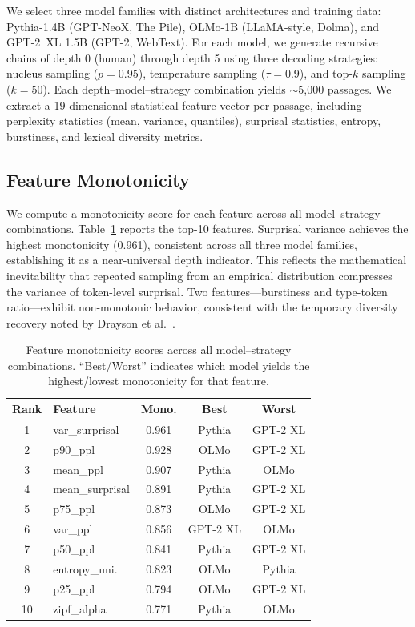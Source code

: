 \documentclass[11pt,a4paper]{article}
\begin{document}
We select three model families with distinct architectures and training data: Pythia-1.4B (GPT-NeoX, The Pile), OLMo-1B (LLaMA-style, Dolma), and GPT-2~XL 1.5B (GPT-2, WebText).
For each model, we generate recursive chains of depth 0 (human) through depth 5 using three decoding strategies: nucleus sampling ($p{=}0.95$), temperature sampling ($\tau{=}0.9$), and top-$k$ sampling ($k{=}50$).
Each depth--model--strategy combination yields ${\sim}$5{,}000 passages.
We extract a 19-dimensional statistical feature vector per passage, including perplexity statistics (mean, variance, quantiles), surprisal statistics, entropy, burstiness, and lexical diversity metrics.

\subsection{Feature Monotonicity}
\label{sec:monotonicity}

We compute a monotonicity score for each feature across all model--strategy combinations. Table~\ref{tab:monotonicity} reports the top-10 features. Surprisal variance achieves the highest monotonicity (0.961), consistent across all three model families, establishing it as a near-universal depth indicator. This reflects the mathematical inevitability that repeated sampling from an empirical distribution compresses the variance of token-level surprisal. Two features---burstiness and type-token ratio---exhibit non-monotonic behavior, consistent with the temporary diversity recovery noted by Drayson et al.~\cite{drayson2025investigating}.

\begin{table}[t]
\centering
\small
\begin{tabular}{clccc}
\toprule
\textbf{Rank} & \textbf{Feature} & \textbf{Mono.} & \textbf{Best} & \textbf{Worst} \\
\midrule
1 & var\_surprisal & 0.961 & Pythia & GPT-2 XL \\
2 & p90\_ppl       & 0.928 & OLMo  & GPT-2 XL \\
3 & mean\_ppl      & 0.907 & Pythia & OLMo \\
4 & mean\_surprisal& 0.891 & Pythia & GPT-2 XL \\
5 & p75\_ppl       & 0.873 & OLMo  & GPT-2 XL \\
6 & var\_ppl       & 0.856 & GPT-2 XL & OLMo \\
7 & p50\_ppl       & 0.841 & Pythia & GPT-2 XL \\
8 & entropy\_uni.  & 0.823 & OLMo  & Pythia \\
9 & p25\_ppl       & 0.794 & OLMo  & GPT-2 XL \\
10& zipf\_alpha    & 0.771 & Pythia & OLMo \\
\bottomrule
\end{tabular}
\caption{Feature monotonicity scores across all model--strategy combinations. ``Best/Worst'' indicates which model yields the highest/lowest monotonicity for that feature.}
\label{tab:monotonicity}
\end{table}
\end{document}
